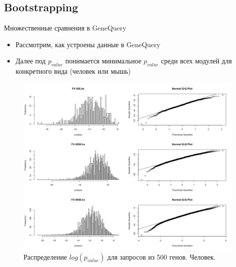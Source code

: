 \documentclass[10pt,pdf,utf8,russian,aspectratio=169]{beamer}
\begin{document}
\subsection{Bootstrapping}

\begin{frame}{Множественные сравнения в GeneQuery}
  \begin{itemize}[<+->]
    \item Рассмотрим, как устроены данные в GeneQuery
    \item Далее под $p_{value}$ понимается минимальное $p_{value}$ среди всех модулей для конкретного вида (человек или мышь)
  \end{itemize}
\end{frame}
   
   
\begin{frame}
    \begin{figure}[p]
        \centering
        \caption{Распределение $log(p_{value})$ для запросов из 500 генов. Человек.}
        \includegraphics[height=0.95\textheight]{./img/converge_to_norm_query_size_500_hs.jpeg}
    \end{figure}
\end{frame}
\end{document}
